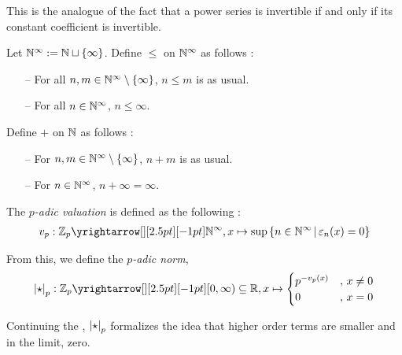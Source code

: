 \begin{rmk}
 
  This is the analogue of the fact that a power series is invertible 
  if and only if its constant coefficient is invertible. 
\end{rmk}

\begin{dfn}
  
  Let $\mathbb{N}^\infty := \mathbb{N} \sqcup \left\{\infty\right\}$.
  Define $\leq$ on $\mathbb{N}^\infty$ as follows : 
  \begin{itemize}
    \item[--] For all $n, m \in \mathbb{N}^\infty\setminus\left\{\infty\right\}$, 
    $n \leq m$ is as usual. 
    \item[--] For all $n \in \mathbb{N}^\infty$, $n \leq \infty$. 
  \end{itemize}

  Define $+$ on $\mathbb{N}$ as follows : 
  \begin{itemize}
    \item[--] For $n, m \in \mathbb{N}^\infty\setminus\left\{\infty\right\}$, $n + m$ is as usual. 
    \item[--] For $n \in \mathbb{N}^\infty$, $n + \infty = \infty$. 
  \end{itemize}
\end{dfn}

\begin{dfn}
  
  The \emph{$p$-adic valuation} is defined as the following : 
  \begin{align*}
    v_p : \map{\Z_p}{\N^\infty}{}{}, 
    x \mapsto \sup\set{n \in \N^\infty \st \ep_n(x) = 0}
  \end{align*}

  From this, we define the \emph{$p$-adic norm}, 
  \begin{align*}
    \abs{\star}_p : \map{\Z_p}{[0,\infty)\subs \R}{}{}, 
    x \mapsto \begin{cases}
      p^{-v_p(x)} &,\, x \neq 0 \\
      0 &,\, x = 0
    \end{cases}
  \end{align*}
\end{dfn}

\begin{rmk}
  
  Continuing the ,
  $\left\vert \star \right\vert_p$ formalizes the idea that 
  higher order terms are smaller and in the limit, zero. 
\end{rmk}

